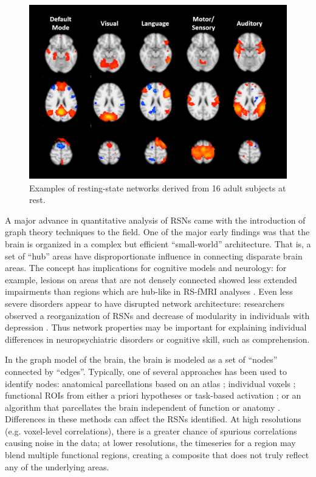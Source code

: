 \begin{figure}[t]
    \centering
    \includegraphics[height=3in]{images/ch1-ica.png}
    \caption[Examples of resting-state networks.]{Examples of resting-state networks derived from 16 adult subjects at rest.}
    \label{fig:ch1-ica}
\end{figure}

A major advance in quantitative analysis of RSNs came with the introduction of graph theory techniques to the field. One of the major early findings was that the brain is organized in a complex but efficient ``small-world'' architecture. That is, a set of ``hub'' areas have disproportionate influence in connecting disparate brain areas. The concept has implications for cognitive models and neurology: for example, lesions on areas that are not densely connected showed less extended impairments than regions which are hub-like in RS-fMRI analyses \citep{Warren2014}. Even less severe disorders appear to have disrupted network architecture: researchers observed a reorganization of RSNs and decrease of modularity in individuals with depression \citep{Lord2012}. Thus network properties may be important for explaining individual differences in neuropsychiatric disorders or cognitive skill, such as comprehension.

In the graph model of the brain, the brain is modeled as a set of ``nodes'' connected by ``edges''. Typically, one of several approaches has been used to identify nodes: anatomical parcellations based on an atlas \citep{Supekar2008, Liu2008, Lynall2010}; individual voxels \citep{Fair2007}; functional ROIs from either a priori hypotheses or task-based activation \citep{VandenHeuvel2010}; or an algorithm that parcellates the brain independent of function or anatomy \citep{Goni2014}. Differences in these methods can affect the RSNs identified. At high resolutions (e.g. voxel-level correlations), there is a greater chance of spurious correlations causing noise in the data; at lower resolutions, the timeseries for a region may blend multiple functional regions, creating a composite that does not truly reflect any of the underlying areas. 


